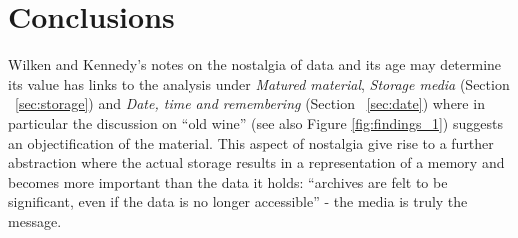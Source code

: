 \documentclass[runningheads,a4paper]{cmmr2023}
\begin{document}
\section{Conclusions}







Wilken and Kennedy’s \cite{Wilken2021} notes on the nostalgia of data and its age may determine its value has links to the analysis under \emph{Matured material}, \emph{Storage media} (Section ~\ref{sec:storage}) and \emph{Date, time and remembering} (Section ~\ref{sec:date}) where in particular the discussion on “old wine” (see also Figure \ref{fig:findings_1}) suggests an objectification of the material. This aspect of nostalgia give rise to a further abstraction where the actual storage results in a representation of a memory and becomes more important than the data it holds: “archives are felt to be signiﬁcant, even if the data is no longer accessible” \cite{Wilken2021} - the media is truly the message.
\end{document}

